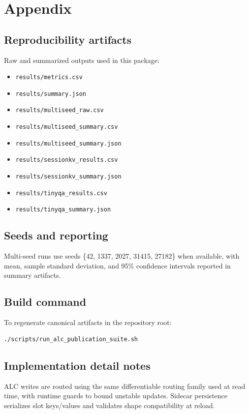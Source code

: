\section{Appendix}
\subsection{Reproducibility artifacts}
Raw and summarized outputs used in this package:
\begin{itemize}
  \item \texttt{results/metrics.csv}
  \item \texttt{results/summary.json}
  \item \texttt{results/multiseed\_raw.csv}
  \item \texttt{results/multiseed\_summary.csv}
  \item \texttt{results/multiseed\_summary.json}
  \item \texttt{results/sessionkv\_results.csv}
  \item \texttt{results/sessionkv\_summary.json}
  \item \texttt{results/tinyqa\_results.csv}
  \item \texttt{results/tinyqa\_summary.json}
\end{itemize}

\subsection{Seeds and reporting}
Multi-seed runs use seeds \{42, 1337, 2027, 31415, 27182\} when available, with mean, sample standard deviation, and 95\% confidence intervals reported in summary artifacts.

\subsection{Build command}
To regenerate canonical artifacts in the repository root:
\begin{verbatim}
./scripts/run_alc_publication_suite.sh
\end{verbatim}

\subsection{Implementation detail notes}
ALC writes are routed using the same differentiable routing family used at read time, with runtime guards to bound unstable updates. Sidecar persistence serializes slot keys/values and validates shape compatibility at reload.

